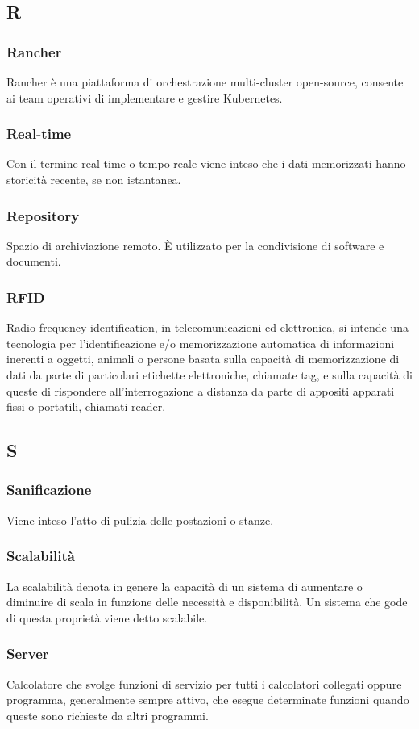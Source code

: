 \subsection*{R}
\subsubsection*{Rancher} Rancher è una piattaforma di orchestrazione multi-cluster open-source, consente ai team operativi di implementare e gestire Kubernetes.
\subsubsection*{Real-time} Con il termine real-time o tempo reale viene inteso che i dati memorizzati hanno storicità recente, se non istantanea.
\subsubsection*{Repository} Spazio di archiviazione remoto. È utilizzato per la condivisione di software e documenti.
\subsubsection*{RFID} Radio-frequency identification, in telecomunicazioni ed elettronica, si intende una tecnologia per l'identificazione e/o memorizzazione automatica di informazioni inerenti a oggetti, animali o persone basata sulla capacità di memorizzazione di dati da parte di particolari etichette elettroniche, chiamate tag, e sulla capacità di queste di rispondere all'interrogazione a distanza da parte di appositi apparati fissi o portatili, chiamati reader.
\subsection*{S}
\subsubsection*{Sanificazione} Viene inteso l'atto di pulizia delle postazioni o stanze.
\subsubsection*{Scalabilità} La scalabilità denota in genere la capacità di un sistema di aumentare o diminuire di scala in funzione delle necessità e disponibilità. Un sistema che gode di questa proprietà viene detto scalabile.
\subsubsection*{Server} Calcolatore che svolge funzioni di servizio per tutti i calcolatori collegati oppure programma, generalmente sempre attivo, che esegue determinate funzioni quando queste sono richieste da altri programmi.
